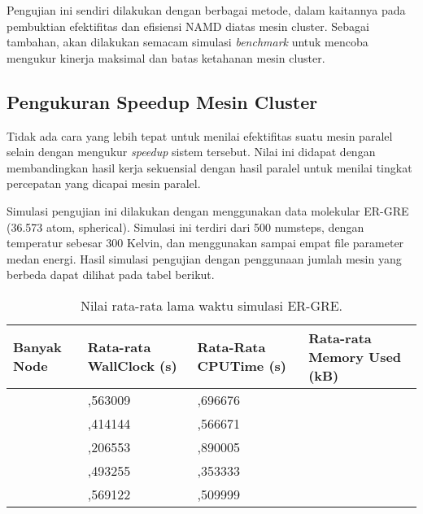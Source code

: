 \documentclass[aps,showpacs,pre,floatfix]{revtex4}
\begin{document}
Pengujian ini sendiri dilakukan dengan berbagai metode, dalam
kaitannya pada pembuktian efektifitas dan efisiensi NAMD diatas
mesin cluster. Sebagai tambahan, akan dilakukan semacam simulasi
\textit{benchmark} untuk mencoba mengukur kinerja maksimal dan
batas ketahanan mesin cluster.

\subsection{Pengukuran Speedup Mesin Cluster}

Tidak ada cara yang lebih tepat untuk menilai efektifitas suatu
mesin paralel selain dengan mengukur  \textit{speedup } sistem
tersebut. Nilai ini didapat dengan membandingkan hasil kerja
sekuensial dengan hasil paralel untuk menilai tingkat percepatan
yang dicapai mesin paralel.

Simulasi pengujian ini dilakukan dengan menggunakan data molekular
ER-GRE (36.573 atom, spherical). Simulasi ini terdiri dari 500
numsteps, dengan temperatur sebesar 300  Kelvin, dan
menggunakan sampai empat file parameter medan energi. Hasil
simulasi pengujian dengan penggunaan jumlah mesin yang berbeda
dapat dilihat pada tabel berikut.








\begin{table}
\centering
\begin{tabular}{|p{64pt}|p{70pt}|p{70pt}|p{71pt}|}
\hline
\parbox{64pt}{\centering
Banyak Node } & \parbox{70pt}{\centering Rata-rata WallClock (s) }
& \parbox{70pt}{\centering Rata-Rata CPUTime (s) } &
\parbox{71pt}{\centering Rata-rata Memory Used (kB)
} \\
\hline
\parbox{64pt}{
} & \parbox{70pt}{,563009
} & \parbox{70pt}{,696676
} & \parbox{71pt}{
} \\
\parbox{64pt}{
} & \parbox{70pt}{,414144
} & \parbox{70pt}{,566671
} & \parbox{71pt}{
} \\
\parbox{64pt}{
} & \parbox{70pt}{,206553
} & \parbox{70pt}{,890005
} & \parbox{71pt}{
} \\
\parbox{64pt}{
} & \parbox{70pt}{,493255
} & \parbox{70pt}{,353333
} & \parbox{71pt}{
} \\
\parbox{64pt}{
} & \parbox{70pt}{,569122
} & \parbox{70pt}{,509999
} & \parbox{71pt}{
} \\
\hline
\end{tabular}
\caption{Nilai rata-rata lama waktu simulasi ER-GRE.}\label{T1}
\end{table}
\end{document}
